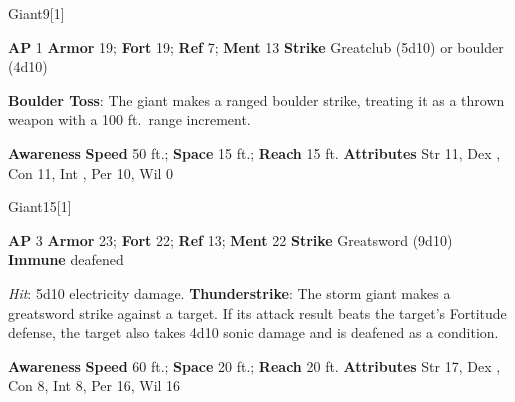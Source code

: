 \begin{monsection}[Stone]{Giant}{9}[1]
\vspace{-1em}\vspace{-1em}
\begin{spellcontent}
\begin{spelltargetinginfo}
{\textbf{AP} 1}
\pari \textbf{Armor} 19;
\textbf{Fort} 19;
\textbf{Ref} 7;
\textbf{Ment} 13
\pari \textbf{Strike} Greatclub  (5d10) or boulder  (4d10)
\end{spelltargetinginfo}
\begin{spelleffects}
\pari
\textbf{Boulder Toss}:
The giant makes a ranged boulder strike, treating it as a thrown weapon with a 100 ft.\ range increment.
\end{spelleffects}
\end{spellcontent}
\begin{spellsubcontent}
\begin{spellfooter}
\pari \textbf{Awareness} 
\pari \textbf{Speed} 50 ft.;
\textbf{Space} 15 ft.;
\textbf{Reach} 15 ft.
\pari \textbf{Attributes}
Str 11,
Dex ,
Con 11,
Int ,
Per 10,
Wil 0
\end{spellfooter}
\end{spellsubcontent}
\end{monsection}
\begin{monsection}[Storm]{Giant}{15}[1]
\vspace{-1em}\vspace{-1em}
\begin{spellcontent}
\begin{spelltargetinginfo}
{\textbf{AP} 3}
\pari \textbf{Armor} 23;
\textbf{Fort} 22;
\textbf{Ref} 13;
\textbf{Ment} 22
\pari \textbf{Strike} Greatsword  (9d10)
\pari \textbf{Immune} deafened
\end{spelltargetinginfo}
\begin{spelleffects}
\pari
{}
\par
\par \textit{Hit}: 5d10 electricity damage.
\vspace{0.5em}
\pari
\textbf{Thunderstrike}:
The storm giant makes a greatsword strike against a target.
If its attack result beats the target's Fortitude defense,
the target also takes 4d10 sonic damage
and is deafened as a condition.
\end{spelleffects}
\end{spellcontent}
\begin{spellsubcontent}
\begin{spellfooter}
\pari \textbf{Awareness} 
\pari \textbf{Speed} 60 ft.;
\textbf{Space} 20 ft.;
\textbf{Reach} 20 ft.
\pari \textbf{Attributes}
Str 17,
Dex ,
Con 8,
Int 8,
Per 16,
Wil 16
\end{spellfooter}
\end{spellsubcontent}
\end{monsection}
